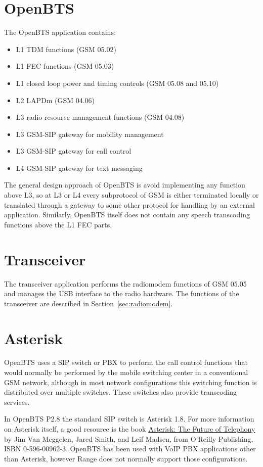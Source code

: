 \documentclass[11pt,openany]{book}
\begin{document}
\section{OpenBTS}
The OpenBTS application contains:
\begin{itemize}
	\item L1 TDM functions (GSM 05.02)
	\item L1 FEC functions (GSM 05.03)
	\item L1 closed loop power and timing controls (GSM 05.08 and 05.10)
	\item L2 LAPDm (GSM 04.06)
	\item L3 radio resource management functions (GSM 04.08)
	\item L3 GSM-SIP gateway for mobility management
	\item L3 GSM-SIP gateway for call control
	\item L4 GSM-SIP gateway for text messaging
\end{itemize}
The general design approach of OpenBTS is avoid implementing any function above L3, so at L3 or L4 every subprotocol of GSM is either terminated locally or translated through a gateway to some other protocol for handling by an external application.  Similarly, OpenBTS itself does not contain any speech transcoding functions above the L1 FEC parts.

\section{Transceiver}
The transceiver application performs the radiomodem functions of GSM 05.05 and manages the USB interface to the radio hardware.  The functions of the transceiver are described in Section~\ref{sec:radiomodem}.

\section{Asterisk}
OpenBTS uses a SIP switch or PBX to perform the call control functions that would normally be performed by the mobile switching center in a conventional GSM network, although in most network configurations this switching function is distributed over multiple switches.
These switches also provide transcoding services.

In OpenBTS P2.8 the standard SIP switch is Asterisk 1.8.  For more information on Asterisk itself, a good resource is the book \underline{Asterisk: The Future of Telephony} by Jim Van Meggelen, Jared Smith, and Leif Madsen, from O'Reilly Publishing, ISBN 0-596-00962-3.  
OpenBTS has been used with VoIP PBX applications other than Asterisk, however Range does not normally support those configurations.
\end{document}
